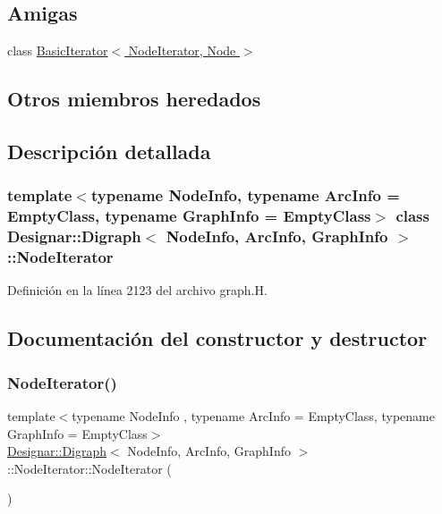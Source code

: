 \subsection*{Amigas}
\begin{DoxyCompactItemize}
\item 
class \hyperlink{class_designar_1_1_digraph_1_1_node_iterator_a21dc6ae614d097ff896e9e8e422d8f3c}{Basic\+Iterator$<$ Node\+Iterator, Node $>$}
\end{DoxyCompactItemize}
\subsection*{Otros miembros heredados}


\subsection{Descripción detallada}
\subsubsection*{template$<$typename Node\+Info, typename Arc\+Info = Empty\+Class, typename Graph\+Info = Empty\+Class$>$\newline
class Designar\+::\+Digraph$<$ Node\+Info, Arc\+Info, Graph\+Info $>$\+::\+Node\+Iterator}



Definición en la línea 2123 del archivo graph.\+H.



\subsection{Documentación del constructor y destructor}
\mbox{\label{class_designar_1_1_digraph_1_1_node_iterator_a53d6530188cf6c4ed6d2b2b114af9967}} 
\subsubsection{\texorpdfstring{Node\+Iterator()}{NodeIterator()}\hspace{0.1cm}{\footnotesize\ttfamily [1/5]}}
{\footnotesize\ttfamily template$<$typename Node\+Info , typename Arc\+Info  = Empty\+Class, typename Graph\+Info  = Empty\+Class$>$ \\
\hyperlink{class_designar_1_1_digraph}{Designar\+::\+Digraph}$<$ Node\+Info, Arc\+Info, Graph\+Info $>$\+::Node\+Iterator\+::\+Node\+Iterator (\begin{DoxyParamCaption}{ }\end{DoxyParamCaption})\hspace{0.3cm}{\ttfamily [inline]}}




